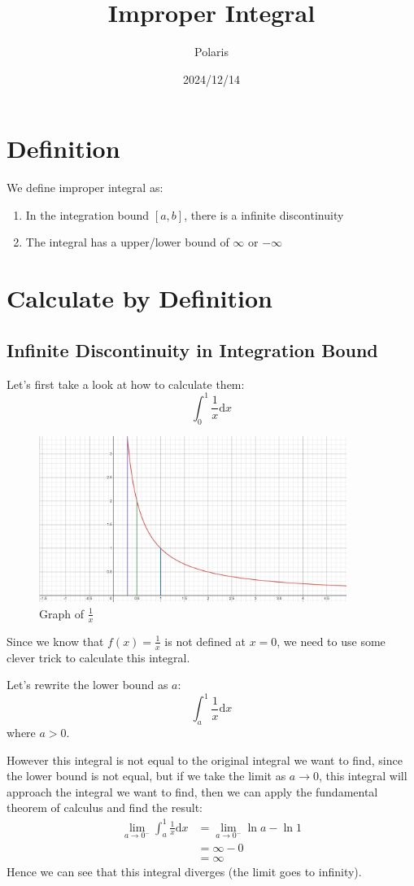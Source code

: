 \documentclass{article}
\title{Improper Integral}
\author{Polaris}
\date{2024/12/14}
\begin{document}
\maketitle

\section{Definition}
We define improper integral as:
\begin{enumerate}
    \item In the integration bound $[a,b]$, there is a infinite discontinuity
    \item The integral has a upper/lower bound of $\infty$ or $-\infty$
\end{enumerate}

\section{Calculate by Definition}
\subsection{Infinite Discontinuity in Integration Bound}
Let's first take a look at how to calculate them:
\begin{equation}
    \int_0^1 \frac{1}{x}\mathrm{d}x
\end{equation}

\begin{figure}[H]
    \includegraphics[width = 10cm]{pictures/improperintegral1.png}
    \centering
    \caption{Graph of $\frac{1}{x}$}
\end{figure}
Since we know that $f(x) = \frac{1}{x}$ is not defined at $x=0$, we need to use some clever trick to calculate this integral.

Let's rewrite the lower bound as $a$:
\[
    \int_a^1\frac{1}{x}\mathrm{d}x
\]
where $a>0$.

\newpage
However this integral is not equal to the original integral we want to find, since the lower bound is not equal,
but if we take the limit as $a\to 0$, this integral will approach the integral we want to find, then we can apply the fundamental theorem of calculus and find the result:
\[
    \begin{split}
        \lim_{a\to 0^-} \int_{a}^{1}\frac{1}{x}\mathrm{d}x &= \lim_{a\to 0^-}\ln a - \ln 1 \\
        & = \infty - 0 \\
        & = \infty
    \end{split}
\]
Hence we can see that this integral diverges (the limit goes to infinity).
\end{document}
